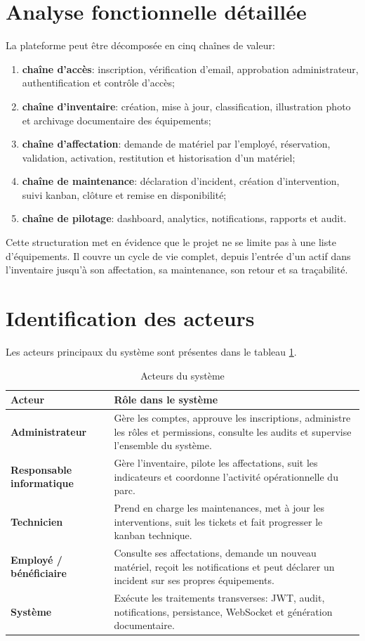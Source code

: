 ﻿\documentclass[12pt,a4paper,oneside]{report}
\begin{document}
\section{Analyse fonctionnelle détaillée}
La plateforme peut être décomposée en cinq chaînes de valeur:
\begin{enumerate}
  \item \textbf{chaîne d'accès}: inscription, vérification d'email, approbation administrateur, authentification et contrôle d'accès;
  \item \textbf{chaîne d'inventaire}: création, mise à jour, classification, illustration photo et archivage documentaire des équipements;
  \item \textbf{chaîne d'affectation}: demande de matériel par l'employé, réservation, validation, activation, restitution et historisation d'un matériel;
  \item \textbf{chaîne de maintenance}: déclaration d'incident, création d'intervention, suivi kanban, clôture et remise en disponibilité;
  \item \textbf{chaîne de pilotage}: dashboard, analytics, notifications, rapports et audit.
\end{enumerate}

Cette structuration met en évidence que le projet ne se limite pas à une liste d'équipements. Il couvre un cycle de vie complet, depuis l'entrée d'un actif dans l'inventaire jusqu'à son affectation, sa maintenance, son retour et sa traçabilité.

\section{Identification des acteurs}
Les acteurs principaux du système sont présentes dans le tableau \ref{tab:acteurs}.

\begin{table}[H]
\centering
\caption{Acteurs du système}
\label{tab:acteurs}
\begin{tabularx}{\textwidth}{>{\bfseries}p{3.3cm}X}
\toprule
Acteur & Rôle dans le système \\
\midrule
Administrateur & Gère les comptes, approuve les inscriptions, administre les rôles et permissions, consulte les audits et supervise l'ensemble du système. \\
Responsable informatique & Gère l'inventaire, pilote les affectations, suit les indicateurs et coordonne l'activité opérationnelle du parc. \\
Technicien & Prend en charge les maintenances, met à jour les interventions, suit les tickets et fait progresser le kanban technique. \\
Employé / bénéficiaire & Consulte ses affectations, demande un nouveau matériel, reçoit les notifications et peut déclarer un incident sur ses propres équipements. \\
Système & Exécute les traitements transverses: JWT, audit, notifications, persistance, WebSocket et génération documentaire. \\
\bottomrule
\end{tabularx}
\end{table}
\end{document}
